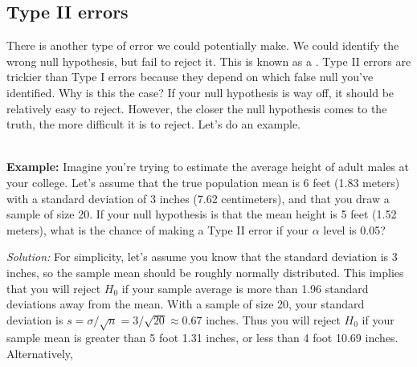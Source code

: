 









\subsection{Type II errors}



There is another type of error we could potentially make.  We could identify the wrong null hypothesis, but fail to reject it.  This is known as a . Type II errors are trickier than Type I errors because they depend on which false null you've identified. Why is this the case? If your null hypothesis is way off, it should be relatively easy to reject. However, the closer the null hypothesis comes to the truth, the more difficult it is to reject. Let's do an example.



\ \\



\textbf{Example:} \ex Imagine you're trying to estimate the average height of adult males at your college. Let's assume that the true population mean is 6 feet (1.83 meters) with a standard deviation of 3 inches (7.62 centimeters), and that you draw a sample of size 20. If your null hypothesis is that the mean height is 5 feet (1.52 meters), what is the chance of making a Type II error if your $\alpha$ level is 0.05?



\emph{Solution:} For simplicity, let's assume you know that the standard deviation is 3 inches, so the sample mean should be roughly normally distributed.  This implies that you will reject $H_{0}$ if your sample average is more than 1.96 standard deviations away from the mean. With a sample of size 20, your standard deviation is $s=\sigma/\sqrt{n}=3/\sqrt{20}\approx0.67$ inches. Thus you will reject $H_{0}$ if your sample mean is greater than 5 foot 1.31 inches, or less than 4 foot 10.69 inches. Alternatively,


